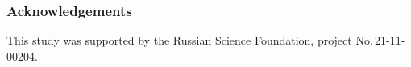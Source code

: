 \documentclass[runningheads]{llncs}
\begin{document}
\subsubsection{Acknowledgements} This study was supported by the Russian Science Foundation, project No.\,21-11-00204.

%
%
%


%
\end{document}
